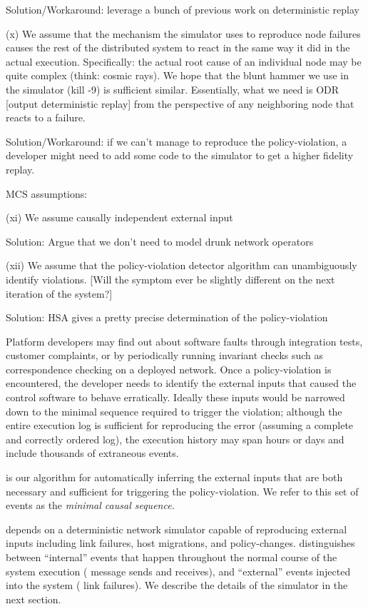 {Solution/Workaround: leverage a bunch of previous work on deterministic replay

(x) We assume that the mechanism the simulator uses to reproduce node failures causes the rest of the distributed system to react in the same way it did in the actual execution. Specifically: the actual root cause of an individual node may be quite complex (think: cosmic rays). We hope that the blunt hammer we use in the simulator (kill -9) is sufficient similar. Essentially, what we need is ODR [output deterministic replay] from the perspective of any neighboring node that reacts to a failure.

Solution/Workaround: if we can't manage to reproduce the policy-violation, a developer might need to add some code to the simulator to get a higher fidelity replay.

MCS assumptions:

(xi) We assume causally independent external input

Solution: Argue that we don't need to model drunk network operators

(xii) We assume that the policy-violation detector algorithm can unambiguously identify violations. [Will the symptom ever be slightly different on the next iteration of the system?] 

Solution: HSA gives a pretty precise determination of the policy-violation
}


Platform developers may find out about software faults
through integration tests, customer complaints, or by periodically running
invariant checks such as correspondence checking on a deployed network. Once a 
policy-violation is encountered, the developer needs to
identify the external inputs that caused the control software to behave
erratically. Ideally these inputs would be narrowed
down to the minimal sequence required to trigger the violation; although the entire
execution log is sufficient for reproducing the error (assuming
a complete and correctly ordered log), the execution history may span
hours or days and include thousands of extraneous events.

\Simulator{} is our algorithm for automatically inferring the external inputs
that are both necessary and sufficient for triggering the policy-violation.
We refer to this set of events as the {\em minimal causal sequence}.

\Simulator{} depends on a deterministic network simulator capable of
reproducing external inputs including link failures, host migrations, and
policy-changes.
\Simulator{} distinguishes
between ``internal'' events that happen throughout the normal course of the
system execution (\eg{} message sends and receives), and ``external'' events
injected into the system (\eg{} link failures). We describe the details
of the simulator in the next section.

